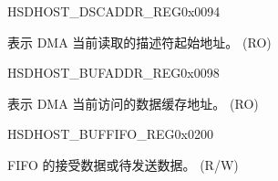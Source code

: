 \begin{register}{H}{SDHOST\_DSCADDR\_REG}{0x0094}\label{regdesc:SDHOSTDSCADDRREG}
%
\regnewline%
\begin{regdesc}\begin{reglist}
\label{fielddesc:SDHOSTDSCADDRREG}\item [SDHOST\_DSCADDR\_REG] 表示 DMA 当前读取的描述符起始地址。 (RO)
\end{reglist}\end{regdesc}
\end{register}


\begin{register}{H}{SDHOST\_BUFADDR\_REG}{0x0098}\label{regdesc:SDHOSTBUFADDRREG}
%
\regnewline%
\begin{regdesc}\begin{reglist}
\label{fielddesc:SDHOSTBUFADDRREG}\item [SDHOST\_BUFADDR\_REG] 表示 DMA 当前访问的数据缓存地址。 (RO)
\end{reglist}\end{regdesc}
\end{register}


\begin{register}{H}{SDHOST\_BUFFIFO\_REG}{0x0200}\label{regdesc:SDHOSTBUFFIFOREG}
%
\regnewline%
\begin{regdesc}\begin{reglist}
\label{fielddesc:SDHOSTBUFFIFOREG}\item [SDHOST\_BUFFIFO\_REG] FIFO 的接受数据或待发送数据。  (R/W)
\end{reglist}\end{regdesc}
\end{register}
